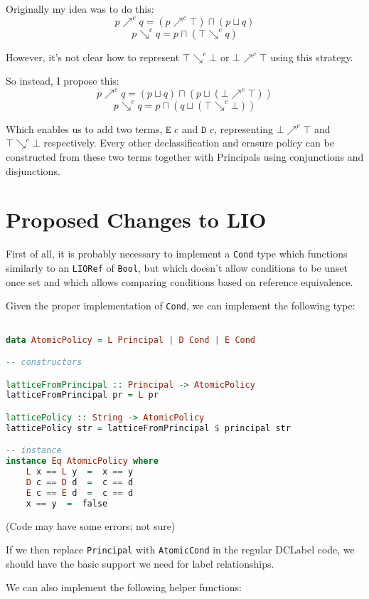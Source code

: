 \documentclass[11pt, oneside]{article}   	%
\begin{document}
Originally my idea was to do this:
$$p\nearrow^c q = (p\nearrow^c\top) \sqcap (p\sqcup q)$$
$$p\searrow^c q = p \sqcap (\top\searrow^c q)$$

However, it's not clear how to represent $\top\searrow^c\bot$ or $\bot\nearrow^c\top$ using this strategy.

So instead, I propose this:
$$p\nearrow^c q = (p\sqcup q) \sqcap (p \sqcup(\bot\nearrow^c\top))$$
$$p\searrow^c q = p \sqcap (q \sqcup (\top\searrow^c \bot))$$

Which enables us to add two terms, $\texttt{E }c$ and $\texttt{D }c$, representing $\bot\nearrow^c\top$ and $\top\searrow^c\bot$ respectively.
Every other declassification and erasure policy can be constructed from these two terms together with Principals using conjunctions and disjunctions.

\section{Proposed Changes to LIO}

First of all, it is probably necessary to implement a \texttt{Cond} type which functions similarly to an \texttt{LIORef} of \texttt{Bool}, but which doesn't allow conditions to be unset once set and which allows comparing conditions based on reference equivalence.

Given the proper implementation of \texttt{Cond}, we can implement the following type:

\begin{lstlisting}[language=Haskell]

data AtomicPolicy = L Principal | D Cond | E Cond

-- constructors

latticeFromPrincipal :: Principal -> AtomicPolicy
latticeFromPrincipal pr = L pr

latticePolicy :: String -> AtomicPolicy
latticePolicy str = latticeFromPrincipal $ principal str

-- instance
instance Eq AtomicPolicy where
	L x == L y  =  x == y
	D c == D d  =  c == d
	E c == E d  =  c == d
	x == y  =  false
\end{lstlisting}
(Code may have some errors; not sure)

If we then replace \texttt{Principal} with \texttt{AtomicCond} in the regular DCLabel code, we should have the basic support we need for label relationships.

We can also implement the following helper functions:
\end{document}
